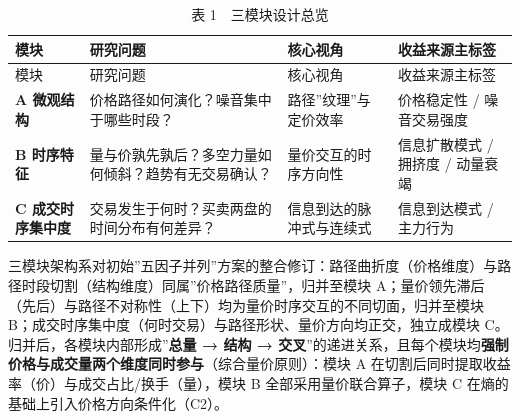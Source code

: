 \documentclass[UTF8,a4paper,zihao=-4,fontset=windows]{ctexart}
\begin{document}
\begin{longtable}[]{@{}
  >{\raggedright\arraybackslash}p{}
  >{\raggedright\arraybackslash}p{}
  >{\raggedright\arraybackslash}p{}
  >{\raggedright\arraybackslash}p{}@{}}
\caption{表 1　三模块设计总览}\tabularnewline
\toprule\noalign{}
\begin{minipage}[b]{\linewidth}\raggedright
模块
\end{minipage} & \begin{minipage}[b]{\linewidth}\raggedright
研究问题
\end{minipage} & \begin{minipage}[b]{\linewidth}\raggedright
核心视角
\end{minipage} & \begin{minipage}[b]{\linewidth}\raggedright
收益来源主标签
\end{minipage} \\
\midrule\noalign{}
\endfirsthead
\toprule\noalign{}
\begin{minipage}[b]{\linewidth}\raggedright
模块
\end{minipage} & \begin{minipage}[b]{\linewidth}\raggedright
研究问题
\end{minipage} & \begin{minipage}[b]{\linewidth}\raggedright
核心视角
\end{minipage} & \begin{minipage}[b]{\linewidth}\raggedright
收益来源主标签
\end{minipage} \\
\midrule\noalign{}
\endhead
\bottomrule\noalign{}
\endlastfoot
\textbf{A 微观结构} & 价格路径如何演化？噪音集中于哪些时段？ &
路径''纹理''与定价效率 & 价格稳定性 / 噪音交易强度 \\
\textbf{B 时序特征} &
量与价孰先孰后？多空力量如何倾斜？趋势有无交易确认？ &
量价交互的时序方向性 & 信息扩散模式 / 拥挤度 / 动量衰竭 \\
\textbf{C 成交时序集中度} & 交易发生于何时？买卖两盘的时间分布有何差异？
& 信息到达的脉冲式与连续式 & 信息到达模式 / 主力行为 \\
\end{longtable}

三模块架构系对初始''五因子并列''方案的整合修订：路径曲折度（价格维度）与路径时段切割（结构维度）同属''价格路径质量''，归并至模块
A；量价领先滞后（先后）与路径不对称性（上下）均为量价时序交互的不同切面，归并至模块
B；成交时序集中度（何时交易）与路径形状、量价方向均正交，独立成模块
C。归并后，各模块内部形成''\textbf{总量 → 结构 →
交叉}''的递进关系，且每个模块均\textbf{强制价格与成交量两个维度同时参与}（综合量价原则）：模块
A 在切割后同时提取收益率（价）与成交占比/换手（量），模块 B
全部采用量价联合算子，模块 C 在熵的基础上引入价格方向条件化（C2）。
\end{document}
